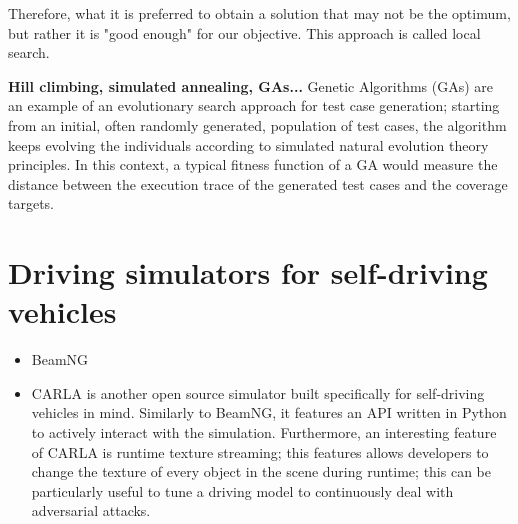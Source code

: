 Therefore, what it is preferred to obtain a solution that may not be the optimum, but rather it is "good enough" for our objective. This approach is called local search.

 
\textbf{Hill climbing, simulated annealing, GAs...}
Genetic Algorithms (GAs) are an example of an
evolutionary search approach for test case generation; starting from an initial, often randomly generated, population of 
test cases, the algorithm keeps evolving the individuals according to simulated natural evolution theory principles.
In this context, a typical fitness function of a GA would measure the distance between the execution trace of the generated test cases
and the coverage targets.





\newpage
\section{Driving simulators for self-driving vehicles}

\begin{itemize}
    \item BeamNG
    \item CARLA \cite{Dosovitskiy17} is another open source simulator built specifically for self-driving vehicles in mind. Similarly to BeamNG, it features an API written in Python to actively interact with the simulation. Furthermore, an interesting feature of CARLA is runtime texture streaming; this features allows developers to change the texture of every object in the scene during runtime; this can be particularly useful to tune a driving model to continuously deal with adversarial attacks.
    

\end{itemize}